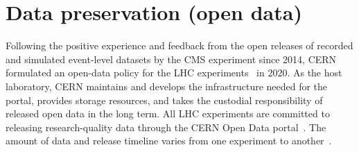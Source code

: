 \documentclass[11pt]{article}
\begin{document}


\section{Data preservation (open data)}
\label{data-preservation}


Following the positive experience and feedback from the open releases of recorded and simulated event-level datasets by the CMS experiment since 2014, CERN formulated an open-data policy for the LHC experiments~\cite{cern-data-policy} in 2020. As the host laboratory, CERN maintains and develops the infrastructure needed for the portal, provides storage resources, and takes the custodial responsibility of released open data in the long term. All LHC experiments are committed to releasing research-quality data through the CERN Open Data portal~\cite{CODP}. The amount of data and release timeline varies from one experiment to another~\cite{cern-data-policy,cern-open-data-privacy-policy,cms-open-data-policy,atlas-open-data-policy,lhcb-open-data-policy,alice-open-data-policy}. 
\end{document}
